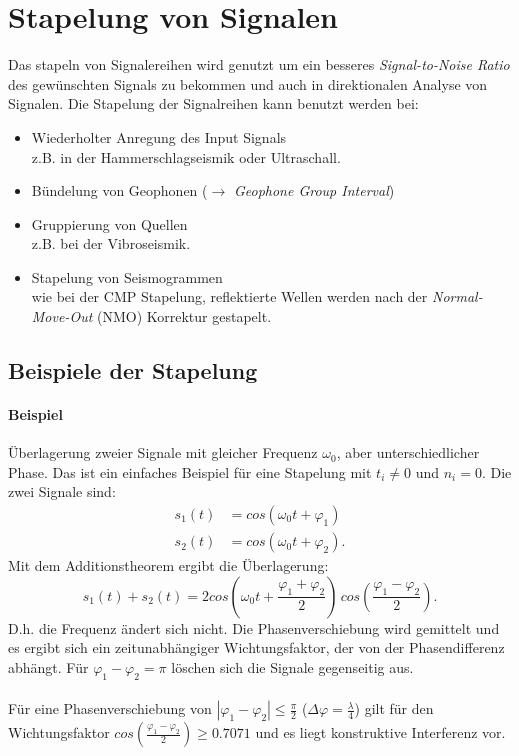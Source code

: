 \chapter{Stapelung von Signalen}
Das stapeln von Signalereihen wird genutzt um ein besseres \textit{Signal-to-Noise Ratio} des gewünschten Signals zu bekommen und auch in direktionalen Analyse von Signalen.
Die Stapelung der Signalreihen kann benutzt werden bei:
\begin{itemize}
\item Wiederholter Anregung des Input Signals\\
z.B. in der Hammerschlagseismik oder Ultraschall.
\item Bündelung von Geophonen ($\rightarrow$ \textit{Geophone Group Interval})
\item Gruppierung von Quellen\\
z.B. bei der Vibroseismik.
\item Stapelung von Seismogrammen\\
wie bei der CMP Stapelung, reflektierte Wellen werden nach der \textit{Normal-Move-Out} (NMO) Korrektur gestapelt.
\end{itemize}

\section{Beispiele der Stapelung}
\subsubsection*{Beispiel}
Überlagerung zweier Signale mit gleicher Frequenz $\omega_0$, aber unterschiedlicher Phase.  Das ist ein einfaches Beispiel für eine Stapelung mit $t_i\not= 0$ und $n_i=0$. Die zwei Signale sind:
\begin{align*}
s_1(t) & =cos(\omega_0 t+\varphi_1)\\
s_2(t) & =cos(\omega_0 t+\varphi_2).
\end{align*}
Mit dem Additionstheorem ergibt die Überlagerung:
\begin{equation}
s_1(t)+s_2(t)=2cos\left(\omega_0 t + \frac {\varphi_1 + \varphi_2}{2}\right)\,cos\left(\frac {\varphi_1 - \varphi_2}{2}\right).
\end{equation}
D.h. die Frequenz ändert sich nicht. Die Phasenverschiebung wird gemittelt und es ergibt sich ein zeitunabhängiger Wichtungsfaktor, der von der Phasendifferenz abhängt. Für $\varphi_1-\varphi_2= \pi $ löschen sich die Signale gegenseitig aus.\\\\
Für eine Phasenverschiebung von $|\varphi_1-\varphi_2|\le \frac{\pi}{2}$ ($\Delta\varphi = \frac{\lambda}{4}$) gilt für den Wichtungsfaktor $cos(\frac{\varphi_1-\varphi_2}{2})\ge 0.7071$ und es liegt konstruktive Interferenz vor.\\ 


